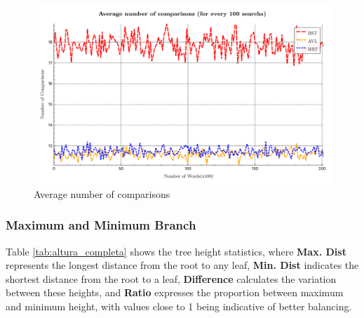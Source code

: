  \begin{figure}[H]
     \centering
     \includegraphics[width=0.8\linewidth]{img/Graph_7_20274.pdf}
     \caption{Average number of comparisons}
     \label{fig:averagecomp}
 \end{figure}

 \subsubsection{Maximum and Minimum Branch}

 Table \ref{tab:altura_completa} shows the tree height statistics,
 where \textbf{Max. Dist} represents the longest distance from the root to any leaf,
 \textbf{Min. Dist} indicates the shortest distance from the root to a leaf, \textbf{Difference}
 calculates the variation between these heights, and \textbf{Ratio} expresses the proportion between maximum
 and minimum height, with values close to 1 being indicative of better balancing.

